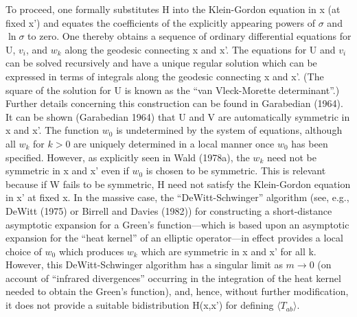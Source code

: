 \documentclass[11pt,a4paper]{article}
\begin{document}
To proceed, one formally substitutes H into the Klein-Gordon equation in x (at fixed x') and equates the coefficients of the explicitly appearing powers of \(\sigma\) and \(\ln\sigma\) to zero. One thereby obtains a sequence of ordinary differential equations for U, \(v_i\), and \(w_k\) along the geodesic connecting x and x'. The equations for U and \(v_i\) can be solved recursively and have a unique regular solution which can be expressed in terms of integrals along the geodesic connecting x and x'. (The square of the solution for U is known as the ``van Vleck-Morette determinant''.) Further details concerning this construction can be found in Garabedian (1964). It can be shown (Garabedian 1964) that U and V are automatically symmetric in x and x'. The function \(w_0\) is undetermined by the system of equations, although all \(w_k\) for \(k>0\) are uniquely determined in a local manner once \(w_0\) has been specified. However, as explicitly seen in Wald (1978a), the \(w_k\) \hypertarget{source-106}{} need not be symmetric in x and x' even if \(w_0\) is chosen to be symmetric. This is relevant because if W fails to be symmetric, H need not satisfy the Klein-Gordon equation in x' at fixed x. In the massive case, the ``DeWitt-Schwinger'' algorithm (see, e.g., DeWitt (1975) or Birrell and Davies (1982)) for constructing a short-distance asymptotic expansion for a Green's function---which is based upon an asymptotic expansion for the ``heat kernel'' of an elliptic operator---in effect provides a local choice of \(w_0\) which produces \(w_k\) which are symmetric in x and x' for all k. However, this DeWitt-Schwinger algorithm has a singular limit as \(m{\to}0\) (on account of ``infrared divergences'' occurring in the integration of the heat kernel needed to obtain the Green's function), and, hence, without further modification, it does not provide a suitable bidistribution H(x,x') for defining \({\langle }T_{ab}{\rangle }\).
\end{document}
